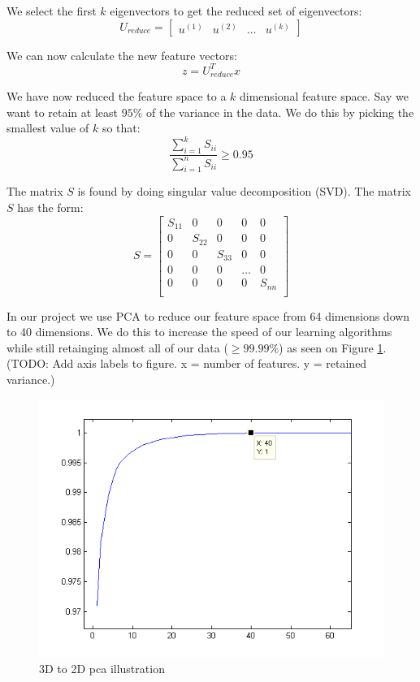 We select the first $k$ eigenvectors to get the reduced set of eigenvectors:
\begin{equation}
U_{reduce} = \begin{bmatrix}
   u^{(1)} & u^{(2)} & \dots & u^{(k)}
 \end{bmatrix}
\end{equation}

We can now calculate the new feature vectors:
\begin{equation}
z = U_{reduce}^Tx
\end{equation}

We have now reduced the feature space to a $k$ dimensional feature space.
Say we want to retain at least $95\%$ of the variance in the data.
We do this by picking the smallest value of $k$ so that:
\begin{equation}
\frac{\displaystyle\sum^{k}_{i=1} S_{ii}}{\displaystyle\sum^{n}_{i=1} S_{ii}} \geq 0.95
\end{equation}

The matrix $S$ is found by doing singular value decomposition (SVD). The matrix $S$ has the form:
\begin{equation}
S =  
\begin{bmatrix}
S_{11} & 0 & 0 & 0 & 0 \\
0 & S_{22} & 0 & 0 & 0 \\
0 & 0 & S_{33} & 0 & 0 \\
0 & 0 & 0 & \dots & 0 \\
0 & 0 & 0 & 0 & S_{nn} \\
\end{bmatrix}
\end{equation}

In our project we use PCA to reduce our feature space from 64 dimensions down to 40 dimensions.
We do this to increase the speed of our learning algorithms while still retainging almost all of our data ($\geq 99.99\%$) as seen on Figure \ref{fig:pca-on-our-data}.
(TODO: Add axis labels to figure. x = number of features. y = retained variance.)

\begin{figure}[H]
\centering
\includegraphics{billeder/pca-on-our-data}
\caption{3D to 2D pca illustration}
\label{fig:pca-on-our-data}
\end{figure}

